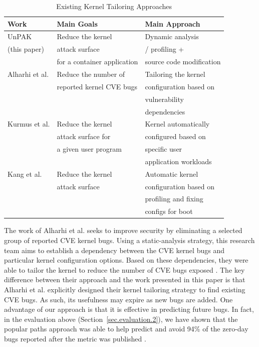 \begin{table}
\begin{center}
\caption{Existing Kernel Tailoring Approaches}
\label{tab:existing-approaches}
\begin{tabular}{l|l|l}
 Work & Main Goals & Main Approach \\
 \hline
 UnPAK & Reduce the kernel & Dynamic analysis \\
  (this paper) &  attack surface & / profiling + \\
  & for a container application & source code modification \\
 \hline
 Alharhi et al. & Reduce the number of & Tailoring the kernel \\
 \cite{SALAD18} & reported kernel CVE bugs & configuration based on \\
 & & vulnerability \\ 
 & & dependencies \\
 \hline
 Kurmus et al. & Reduce the kernel & Kernel automatically \\
 \cite{NDSS13} & attack surface for & configured  based on \\
 & a given user program & specific user \\
 & & application workloads \\
 \hline
 Kang et al. & Reduce the kernel & Automatic kernel \\
 \cite{Linux-Kernel-Tailoring-Framework} & attack surface &  configuration based on \\
 & & profiling and fixing \\
 & & configs for boot
\end{tabular}
\end{center}
\end{table}

The work of Alharhi et al. \cite{SALAD18} seeks to improve security by eliminating a selected group of reported CVE kernel bugs. 
Using a static-analysis strategy, this research team aims to establish a dependency between the CVE kernel bugs and particular kernel configuration options. 
Based on these dependencies, they were able to tailor the kernel to reduce the number of CVE bugs exposed . 
The key difference between their approach and the work presented in this paper is that Alharhi et al. explicitly designed their kernel tailoring strategy to find existing CVE bugs. 
As such, its usefulness may expire as new bugs are added. One advantage of our approach is that it is effective in predicting future bugs. 
In fact, in the evaluation above (Section~{\ref{sec.evaluation.2}}), we have shown that the popular paths approach was able to help predict and avoid 94\% of the zero-day bugs reported after the metric was published \cite{Lock-in-Pop}. 

